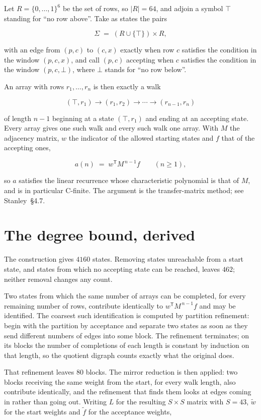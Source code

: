 \documentclass[11pt]{article}
\theoremstyle{definition}
\begin{document}
Let $R = \{0,\dots,1\}^{6}$ be the set of rows, so $|R| = 64$, and adjoin a symbol $\top$ standing for ``no row above''. Take as states the pairs

\[\Sigma \;=\; (R \cup \{\top\}) \times R,\]

with an edge from $(p,c)$ to $(c,x)$ exactly when row $c$ satisfies the condition in the window $(p,c,x)$, and call $(p,c)$ accepting when $c$ satisfies the condition in the window $(p,c,\bot)$, where $\bot$ stands for ``no row below''.

An array with rows $r_1,\dots,r_n$ is then exactly a walk

\[(\top,r_1) \to (r_1,r_2) \to \cdots \to (r_{n-1},r_n)\]

of length $n-1$ beginning at a state $(\top,r_1)$ and ending at an accepting state. Every array gives one such walk and every such walk one array. With $M$ the adjacency matrix, $w$ the indicator of the allowed starting states and $f$ that of the accepting ones,

\[a(n) \;=\; w^{\mathsf T} M^{\,n-1} f \qquad (n \ge 1),\]

so $a$ satisfies the linear recurrence whose characteristic polynomial is that of $M$, and is in particular C-finite. The argument is the transfer-matrix method; see Stanley~\S4.7.

\section{The degree bound, derived}

The construction gives $4160$ states. Removing states unreachable from a start state, and states from which no accepting state can be reached, leaves $462$; neither removal changes any count.

Two states from which the same number of arrays can be completed, for every remaining number of rows, contribute identically to $w^{\mathsf T}M^{\,n-1}f$ and may be identified. The coarsest such identification is computed by partition refinement: begin with the partition by acceptance and separate two states as soon as they send different numbers of edges into some block. The refinement terminates; on its blocks the number of completions of each length is constant by induction on that length, so the quotient digraph counts exactly what the original does.

That refinement leaves $80$ blocks. The mirror reduction is then applied: two blocks receiving the same weight from the start, for every walk length, also contribute identically, and the refinement that finds them looks at edges coming in rather than going out. Writing $L$ for the resulting $S \times S$ matrix with $S = 43$, $\tilde w$ for the start weights and $\tilde f$ for the acceptance weights,
\end{document}
